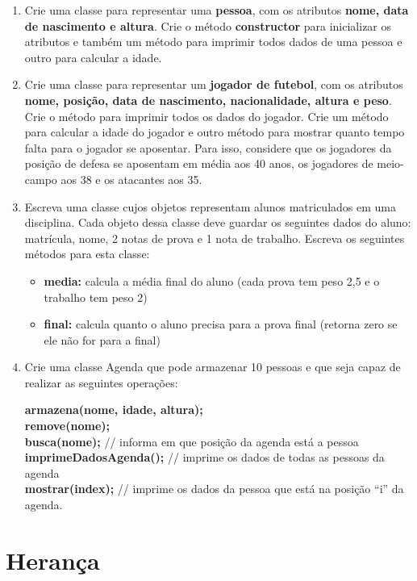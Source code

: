 \begin{enumerate}
	\item Crie uma classe para representar uma \textbf{pessoa}, com os atributos \textbf{nome, data de nascimento e altura}. Crie o método \textbf{constructor} para inicializar os atributos e também um método para imprimir todos dados de uma pessoa e outro para calcular a idade.

	\item Crie uma classe para representar um \textbf{jogador de futebol}, com os atributos \textbf{nome, posição, data de nascimento, nacionalidade, altura e peso}. Crie o método para imprimir todos os dados do jogador. Crie um método para calcular a idade do jogador e outro método para mostrar quanto tempo falta para o jogador se aposentar. Para isso, considere que os jogadores da posição de defesa se aposentam em média aos 40 anos, os jogadores de meio-campo aos 38 e os atacantes aos 35.

	\item Escreva uma classe cujos objetos representam alunos matriculados em uma disciplina. Cada objeto dessa classe deve guardar os seguintes dados do aluno: matrícula, nome, 2 notas de prova e 1 nota de trabalho. Escreva os seguintes métodos para esta classe:

	\begin{itemize}
		\item \textbf{media:} calcula a média final do aluno (cada prova tem peso 2,5 e o trabalho tem peso 2) 
		\item \textbf{final:} calcula quanto o aluno precisa para a prova final (retorna zero se ele não for para a final)
	\end{itemize}
	
	\item Crie uma classe Agenda que pode armazenar 10 pessoas e que seja capaz de realizar as seguintes operações:

	\textbf{armazena(nome, idade, altura);} \\
	\textbf{remove(nome);} \\
	\textbf{busca(nome);} // informa em que posição da agenda está a pessoa \\
	\textbf{imprimeDadosAgenda();} // imprime os dados de todas as pessoas da agenda \\
	\textbf{mostrar(index);} // imprime os dados da pessoa que está na posição ``i'' da
agenda. 
\end{enumerate}

\section{Herança}


